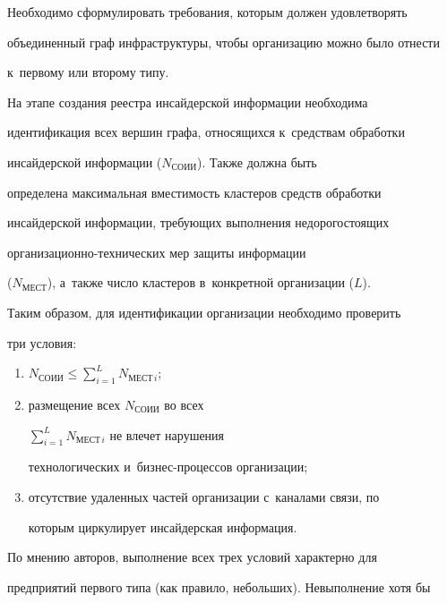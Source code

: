      Необходимо сформулировать требования, которым должен удовлетворять 


объединенный граф инфраструктуры, чтобы организацию можно было отнести 


к~первому или второму типу.


     


     На этапе создания реестра инсайдерской информации необходима 


идентификация всех вершин графа, относящихся к~средствам обработки 


инсайдерской информации ($N_{\mathrm{СОИИ}}$). Также должна быть 


определена максимальная вмес\-ти\-мость кластеров средств обработки 


инсайдерской информации, требующих выполнения недорогостоящих  


организационно-технических мер защиты информации 


($N_{\mathrm{МЕСТ}}$), а~также число кластеров в~конкретной организации ($L$). 


     


     Таким образом, для идентификации организации необходимо проверить 


три условия:


     \begin{enumerate}[(1)]


\item $N_{\mathrm{СОИИ}}\leq \sum\nolimits^L_{i=1} N_{\mathrm{МЕСТ\,}i}$;


\item размещение всех $N_{\mathrm{СОИИ}}$ во всех 


$\sum\nolimits^L_{i=1} N_{\mathrm{МЕСТ}\,i}$ не влечет нарушения 


технологических и~бизнес-процессов организации; 


\item отсутствие удаленных частей организации с~каналами связи, по 


которым циркулирует инсайдерская информация. 


\end{enumerate}


     


     По мнению авторов, выполнение всех трех условий характерно для 


предприятий первого типа (как правило, небольших). Невыполнение хотя бы 


